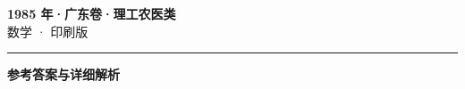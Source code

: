 \documentclass[zihao=5, a4paper]{ctexart}
\begin{document}
\begin{center}
  {\Large\bfseries 1985 年·广东卷·理工农医类}\\[4pt]
  {\large 数学 · 印刷版}
\end{center}
\medskip
{}

\par\bigskip\hrule\bigskip
{}
\begin{center}{\large\bfseries 参考答案与详细解析}\end{center}
\smallskip

\end{document}
